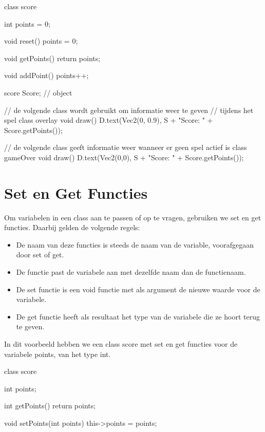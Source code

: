\begin{code}
class score {
  int points = 0;
  
  void reset() {
    points = 0;
  }
  
  void getPoints() {
    return points;
  }
  
  void addPoint() {
    points++;
  }
}

score Score; // object

// de volgende class wordt gebruikt om informatie weer te geven
// tijdens het spel
class overlay {
  void draw() {
    D.text(Vec2(0, 0.9), S + "Score: " + Score.getPoints());
  }
}

// de volgende class geeft informatie weer wanneer er geen spel actief is
class gameOver {
  void draw() {
    D.text(Vec2(0,0), S + "Score: " + Score.getPoints());
  } 
}
\end{code}

\section{Set en Get Functies}

Om variabelen in een class aan te passen of op te vragen, gebruiken we set en get functies. Daarbij gelden de volgende regels:

\begin{itemize}
\item De naam van deze functies is steeds de naam van de variable, voorafgegaan door set of get.
\item De functie past de variabele aan met dezelfde naam dan de functienaam.
\item De set functie is een void functie met als argument de nieuwe waarde voor de variabele.
\item De get functie heeft als resultaat het type van de variabele die ze hoort terug te geven.
\end{itemize}

In dit voorbeeld hebben we een class score met set en get functies voor de variabele points, van het type int.

\begin{code}
class score {
  int points;
  
  int getPoints() {
    return points;
  }
  
  void setPoints(int points) {
    this->points = points;
  } 
}
\end{code}

